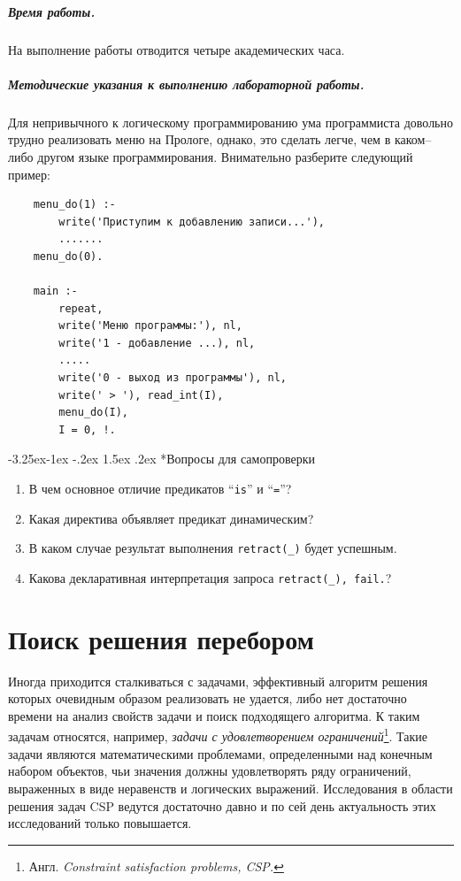 \documentclass[12pt, openany, twoside]{book} %
\makeatletter
\renewcommand\subsubsection{\@startsection{subsubsection}{3}{\z@}%
                                     {-3.25ex\@plus -1ex \@minus -.2ex}%
                                     {1.5ex \@plus .2ex}%
                                     {\normalfont\normalsize\bfseries}}
\newenvironment{questions}{\subsubsection*{Вопросы для самопроверки}\begin{enumerate}}{\end{enumerate}}
\makeatother
\begin{document}
\paragraph{Время работы.} На выполнение работы отводится четыре академических часа.

\paragraph{Методические указания к выполнению лабораторной работы.} Для непривычного к логическому программированию ума программиста довольно трудно реализовать меню на Прологе, однако, это сделать легче, чем в каком--либо другом языке программирования. Внимательно разберите следующий пример:

{\tt\begin{verbatim}
    menu_do(1) :-
        write('Приступим к добавлению записи...'),
        .......
    menu_do(0).

    main :-
        repeat,
        write('Меню программы:'), nl,
        write('1 - добавление ...), nl,
        .....
        write('0 - выход из программы'), nl,
        write(' > '), read_int(I),
        menu_do(I),
        I = 0, !.
\end{verbatim}}
\begin{questions}
  \item{} В чем основное отличие предикатов ``\texttt{is}'' и ``\texttt{=}''?
  \item{} Какая директива объявляет предикат динамическим?
  \item{} В каком случае результат выполнения \texttt{retract(\_)} будет успешным.
  \item{} Какова декларативная интерпретация запроса \texttt{retract(\_), fail.}?
\end{questions}

\chapter{Поиск решения перебором}

Иногда приходится сталкиваться с задачами, эффективный алгоритм решения которых очевидным образом реализовать не удается, либо нет достаточно времени на анализ свойств задачи и поиск подходящего алгоритма. К таким задачам относятся, например, \emph{задачи с удовлетворением ограничений}\footnote{Англ. \emph{Constraint satisfaction problems, CSP.}}. Такие задачи являются математическими проблемами, определенными над конечным набором объектов, чьи значения должны удовлетворять ряду ограничений, выраженных в виде неравенств и логических выражений. Исследования в области решения задач CSP ведутся достаточно давно и по сей день актуальность этих исследований только повышается.
\end{document}
